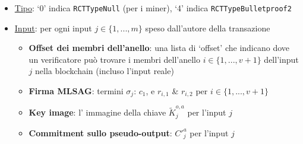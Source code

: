 \begin{itemize}
    \item \underline{Tipo}: `0' indica {\tt RCTTypeNull} (per i miner), `4' indica {\tt RCTTypeBulletproof2} %
    \item \underline{Input}: per ogni input $j \in \{1,...,m\}$ speso dall'autore della transazione
    \begin{itemize}
        \item \textbf{Offset dei membri dell’anello}: una lista di `offset' che indicano dove un verificatore può trovare i membri dell’anello $i \in \{1,...,v+1\}$ dell’input $j$ nella blockchain (incluso l’input reale)
        \item \textbf{Firma MLSAG}: termini $\sigma_j$: $c_1$, e $r_{i,1}$ \& $r_{i,2}$ per $i \in \{1,...,v+1\}$
        \item \textbf{Key image}: l' immagine della chiave $\tilde{K}^{o,a}_j$ per l’input $j$
        \item \textbf{Commitment sullo pseudo-output}: $C'^{a}_j$ per l’input $j$
    \end{itemize}
    

\end{itemize}
